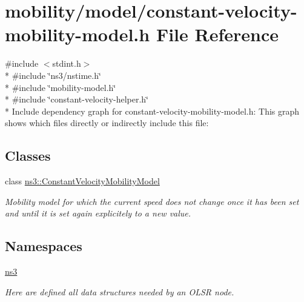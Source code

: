 \hypertarget{constant-velocity-mobility-model_8h}{}\section{mobility/model/constant-\/velocity-\/mobility-\/model.h File Reference}
\label{constant-velocity-mobility-model_8h}
{\ttfamily \#include $<$stdint.\+h$>$}\\*
{\ttfamily \#include \char`\"{}ns3/nstime.\+h\char`\"{}}\\*
{\ttfamily \#include \char`\"{}mobility-\/model.\+h\char`\"{}}\\*
{\ttfamily \#include \char`\"{}constant-\/velocity-\/helper.\+h\char`\"{}}\\*
Include dependency graph for constant-\/velocity-\/mobility-\/model.h\+:
This graph shows which files directly or indirectly include this file\+:
\subsection*{Classes}
\begin{DoxyCompactItemize}
\item 
class \hyperlink{classns3_1_1ConstantVelocityMobilityModel}{ns3\+::\+Constant\+Velocity\+Mobility\+Model}
\begin{DoxyCompactList}\small\item\em Mobility model for which the current speed does not change once it has been set and until it is set again explicitely to a new value. \end{DoxyCompactList}\end{DoxyCompactItemize}
\subsection*{Namespaces}
\begin{DoxyCompactItemize}
\item 
 \hyperlink{namespacens3}{ns3}
\begin{DoxyCompactList}\small\item\em Here are defined all data structures needed by an O\+L\+SR node. \end{DoxyCompactList}\end{DoxyCompactItemize}
